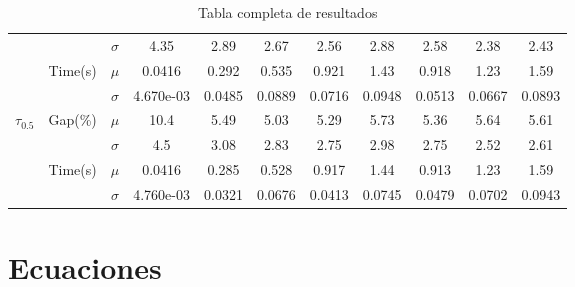 \documentclass[spanish, a4paper, 12pt, openany,final]{book}
\begin{document}
\begin{table}[h]
\begin{adjustbox}{width=\columnwidth,center}
\begin{tabular}{|ccc|cccccccc|}
			&                                                         & $\sigma$ & 4.35 & 2.89 & 2.67 & 2.56 & 2.88 & 2.58 & 2.38 & 2.43 \\
			\cline{3-11}
			& \multirow{2}{*}{Time(s)}                                & $\mu$    & 0.0416 & 0.292 & 0.535 & 0.921 & 1.43 & 0.918 & 1.23 & 1.59\\
			&                                                         & $\sigma$ & 4.670e-03 & 0.0485 & 0.0889 & 0.0716 & 0.0948 & 0.0513 & 0.0667 & 0.0893 \\
			\hline
			\multirow{4}{*}{$\tau_{0.5}$}& \multirow{2}{*}{Gap(\%)}   & $\mu$    & 10.4 & 5.49 & 5.03 & 5.29 & 5.73 & 5.36 & 5.64 & 5.61\\
			&                                                         & $\sigma$ & 4.5 & 3.08 & 2.83 & 2.75 & 2.98 & 2.75 & 2.52 & 2.61 \\
			\cline{3-11}
			& \multirow{2}{*}{Time(s)}                                & $\mu$    & 0.0416 & 0.285 & 0.528 & 0.917 & 1.44 & 0.913 & 1.23 & 1.59\\
			&                                                         & $\sigma$ & 4.760e-03 & 0.0321 & 0.0676 & 0.0413 & 0.0745 & 0.0479 & 0.0702 & 0.0943 \\
			\hline
		\end{tabular}
	\end{adjustbox}
	\label{tab:full_comparison_table}
	\caption{Tabla completa de resultados}
\end{table}







\chapter{Ecuaciones}
\end{document}
